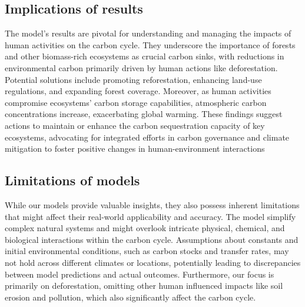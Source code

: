 \documentclass[a4paper]{article}
\begin{document}
\subsection{Implications of results}
The model's results are pivotal for understanding and managing the impacts of human activities on the carbon cycle. They underscore the importance of forests and other biomass-rich ecosystems as crucial carbon sinks, with reductions in environmental carbon primarily driven by human actions like deforestation. Potential solutions include promoting reforestation, enhancing land-use regulations, and expanding forest coverage. Moreover, as human activities compromise ecosystems' carbon storage capabilities, atmospheric carbon concentrations increase, exacerbating global warming. These findings suggest actions to maintain or enhance the carbon sequestration capacity of key ecosystems, advocating for integrated efforts in carbon governance and climate mitigation to foster positive changes in human-environment interactions

\subsection{Limitations of models}
While our models provide valuable insights, they also possess inherent limitations that might affect their real-world applicability and accuracy. The model simplify complex natural systems and might overlook intricate physical, chemical, and biological interactions within the carbon cycle. Assumptions about constants and initial environmental conditions, such as carbon stocks and transfer rates, may not hold across different climates or locations, potentially leading to discrepancies between model predictions and actual outcomes. Furthermore, our focus is primarily on deforestation, omitting other human influenced impacts like soil erosion and pollution, which also significantly affect the carbon cycle.
\end{document}

